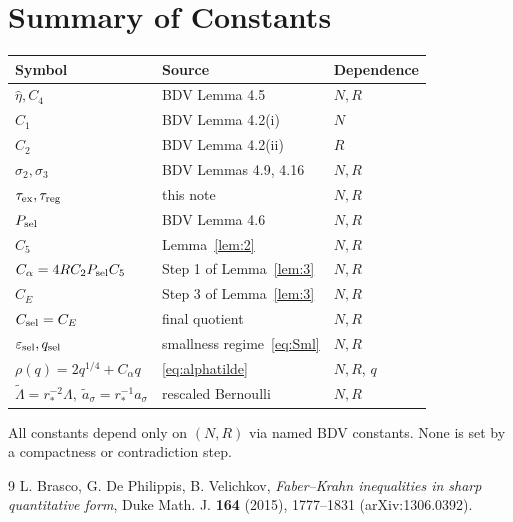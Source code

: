 \documentclass[11pt]{article}
\theoremstyle{definition}
\newcommand{\eps}{\varepsilon}
\newcommand{\wt}{\widetilde}
\begin{document}
\section{Summary of Constants}\label{sec:constants}

\begin{center}
\renewcommand{\arraystretch}{1.25}
\begin{tabular}{|l|l|l|}
\hline
Symbol & Source & Dependence \\\hline
$\hat\eta,C_4$ & BDV Lemma 4.5 & $N,R$ \\
$C_1$ & BDV Lemma 4.2(i) & $N$ \\
$C_2$ & BDV Lemma 4.2(ii) & $R$ \\
$\sigma_2,\sigma_3$ & BDV Lemmas 4.9, 4.16 & $N,R$ \\
$\tau_{\rm ex},\tau_{\rm reg}$ & this note & $N,R$ \\
$P_{\rm sel}$ & BDV Lemma 4.6 & $N,R$ \\
$C_5$ & Lemma~\ref{lem:2} & $N,R$ \\
$C_\alpha=4RC_2P_{\rm sel}C_5$ & Step 1 of Lemma~\ref{lem:3} & $N,R$ \\
$C_E$ & Step 3 of Lemma~\ref{lem:3} & $N,R$ \\
$C_{\rm sel}=C_E$ & final quotient & $N,R$ \\
$\eps_{\rm sel},q_{\rm sel}$ & smallness regime~\eqref{eq:Sml} & $N,R$ \\
$\rho(q)=2q^{1/4}+C_\alpha q$ & \eqref{eq:alphatilde} & $N,R$, $q$ \\
$\wt\Lambda=r_*^{-2}\Lambda,\ \wt a_\sigma=r_*^{-1}a_\sigma$ &
rescaled Bernoulli & $N,R$ \\\hline
\end{tabular}
\end{center}

All constants depend only on $(N,R)$ via named BDV constants. None is set
by a compactness or contradiction step.

\begin{thebibliography}{9}
 L. Brasco, G. De Philippis, B. Velichkov,
\emph{Faber--Krahn inequalities in sharp quantitative form},
Duke Math. J. \textbf{164} (2015), 1777--1831 (arXiv:1306.0392).
\end{thebibliography}
\end{document}
